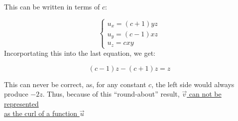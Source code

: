 \begin{enumerate}
\begin{enumerate}
\begin{enumerate}
                This can be written in terms of $c$:

                $$\left\{\begin{array}{l} u_x=(c+1)yz\\u_y=(c-1)xz\\u_z=cxy\end{array}$$
                  Incorportating this into the last equation, we get:

                  $$(c-1)z-(c+1)z=z$$

                This can never be correct, as, for any constant $c$, the left side would always produce $-2z$. Thus, because of this ``round-about'' result, \underline{$\vec{v}$ can not be represented}\\\underline{ as the curl of a function $\vec{u}$}

        \end{enumerate}

    \end{enumerate}

\end{enumerate}



